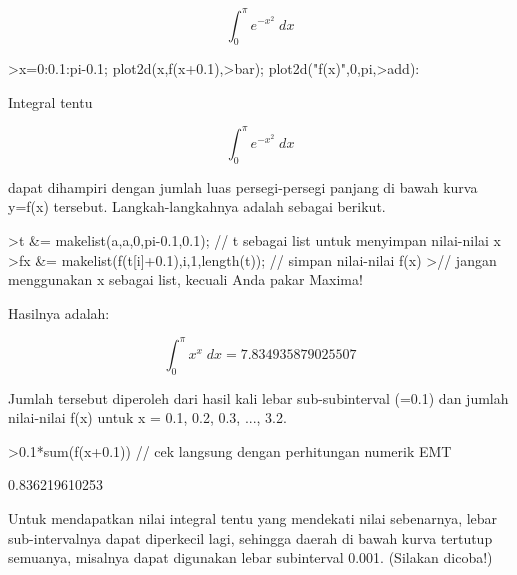 \documentclass{article}
\begin{document}
\begin{eulernotebook}
\begin{eulercomment}
\begin{eulercomment}
\begin{eulercomment}
\begin{eulercomment}
\begin{eulercomment}
\end{eulercomment}
\begin{eulerformula}
\[
 \int_{0}^{\pi}{e^ {- x^2 }\;dx}
\]
\end{eulerformula}
\begin{eulerprompt}
>x=0:0.1:pi-0.1; plot2d(x,f(x+0.1),>bar); plot2d("f(x)",0,pi,>add):
\end{eulerprompt}
\begin{eulercomment}
Integral tentu

\end{eulercomment}
\begin{eulerformula}
\[
 \int_{0}^{\pi}{e^ {- x^2 }\;dx}
\]
\end{eulerformula}
\begin{eulercomment}
dapat dihampiri dengan jumlah luas persegi-persegi panjang di bawah
kurva y=f(x) tersebut. Langkah-langkahnya adalah sebagai berikut.
\end{eulercomment}
\begin{eulerprompt}
>t &= makelist(a,a,0,pi-0.1,0.1); // t sebagai list untuk menyimpan nilai-nilai x
>fx &= makelist(f(t[i]+0.1),i,1,length(t)); // simpan nilai-nilai f(x)
>// jangan menggunakan x sebagai list, kecuali Anda pakar Maxima!
\end{eulerprompt}
\begin{eulercomment}
Hasilnya adalah:

\end{eulercomment}
\begin{eulerformula}
\[
\int_{0}^{\pi}{x^{x}\;dx}=7.834935879025507
\]
\end{eulerformula}
\begin{eulercomment}
Jumlah tersebut diperoleh dari hasil kali lebar sub-subinterval (=0.1)
dan jumlah nilai-nilai f(x) untuk x = 0.1, 0.2, 0.3, ..., 3.2.
\end{eulercomment}
\begin{eulerprompt}
>0.1*sum(f(x+0.1)) // cek langsung dengan perhitungan numerik EMT
\end{eulerprompt}
\begin{euleroutput}
  0.836219610253
\end{euleroutput}
\begin{eulercomment}
Untuk mendapatkan nilai integral tentu yang mendekati nilai sebenarnya, lebar
sub-intervalnya dapat diperkecil lagi, sehingga daerah di bawah kurva tertutup
semuanya, misalnya dapat digunakan lebar subinterval 0.001. (Silakan dicoba!)


\end{eulercomment}
\end{eulercomment}
\end{eulercomment}
\end{eulercomment}
\end{eulercomment}
\end{eulernotebook}
\end{document}
